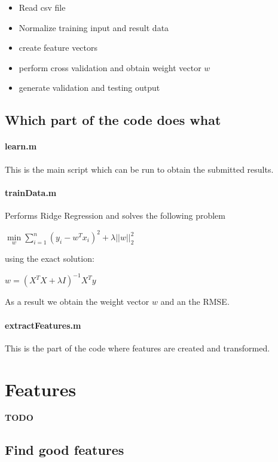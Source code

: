 \documentclass[a4paper, 11pt]{article}
\begin{document}
\begin{itemize}
\item Read csv file
\item Normalize training input and result data
\item create feature vectors
\item perform cross validation and obtain weight vector $w$
\item generate validation and testing output
\end{itemize}

\subsection{Which part of the code does what}

\paragraph{learn.m}
This is the main script which can be run to obtain the submitted results.
\paragraph{trainData.m}
Performs Ridge Regression and solves the following problem

$ \min \limits_w \sum \limits_{i=1}^n \left(y_i - w^Tx_i\right)^2 + \lambda ||w||_2^2$

using the exact solution:


$ w = \left(X^T X + \lambda I   \right)^{-1} X^T y$

As a result we obtain the weight vector $w$ and an the RMSE.

\paragraph{extractFeatures.m}

This is the part of the code where features are created and transformed.


\section{Features}

\textbf{TODO}

\subsection{Find good features}
\label{subsec:findgoodfeatures}
\end{document}
